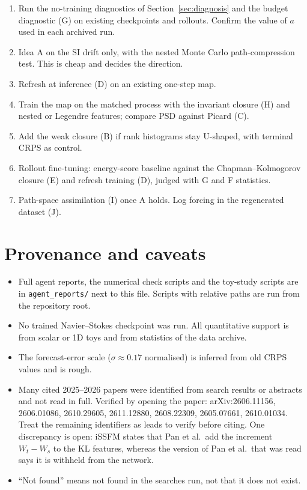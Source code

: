 \documentclass[11pt,a4paper]{article}
\begin{document}
\begin{enumerate}
\item Run the no-training diagnostics of Section~\ref{sec:diagnosis} and the budget diagnostic (G) on existing checkpoints and rollouts. Confirm the value of $a$ used in each archived run.
\item Idea A on the SI drift only, with the nested Monte Carlo path-compression test. This is cheap and decides the direction.
\item Refresh at inference (D) on an existing one-step map.
\item Train the map on the matched process with the invariant closure (H) and nested or Legendre features; compare PSD against Picard (C).
\item Add the weak closure (B) if rank histograms stay U-shaped, with terminal CRPS as control.
\item Rollout fine-tuning: energy-score baseline against the Chapman--Kolmogorov closure (E) and refresh training (D), judged with G and F statistics.
\item Path-space assimilation (I) once A holds. Log forcing in the regenerated dataset (J).
\end{enumerate}

\appendix
\section{Provenance and caveats}\label{sec:provenance}

\begin{itemize}
\item Full agent reports, the numerical check scripts and the toy-study scripts are in \texttt{agent\_reports/} next to this file. Scripts with relative paths are run from the repository root.
\item No trained Navier--Stokes checkpoint was run. All quantitative support is from scalar or 1D toys and from statistics of the data archive.
\item The forecast-error scale ($\sigma\approx0.17$ normalised) is inferred from old CRPS values and is rough.
\item Many cited 2025--2026 papers were identified from search results or abstracts and not read in full. Verified by opening the paper: arXiv:2606.11156, 2606.01086, 2610.29605, 2611.12880, 2608.22309, 2605.07661, 2610.01034. Treat the remaining identifiers as leads to verify before citing. One discrepancy is open: iSSFM states that Pan et al.\ add the increment $W_t-W_s$ to the KL features, whereas the version of Pan et al.\ that was read says it is withheld from the network.
\item ``Not found'' means not found in the searches run, not that it does not exist.
\end{itemize}
\end{document}
